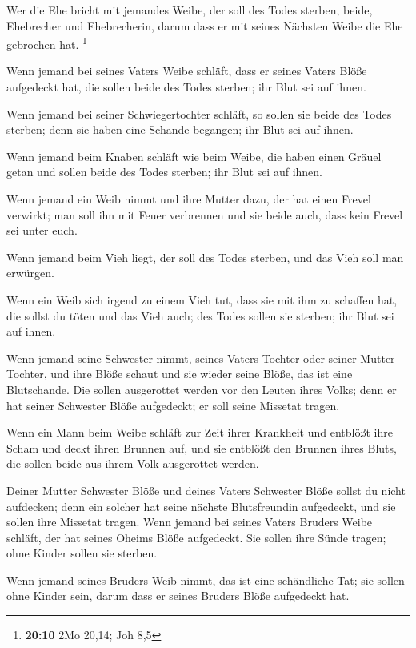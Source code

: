  Wer die Ehe bricht mit jemandes Weibe, der soll des
Todes sterben, beide, Ehebrecher und Ehebrecherin, darum dass er mit
seines Nächsten Weibe die Ehe gebrochen hat. \footnote{\textbf{20:10}
  2Mo 20,14; Joh 8,5}

 Wenn jemand bei seines Vaters Weibe schläft, dass er
seines Vaters Blöße aufgedeckt hat, die sollen beide des Todes sterben;
ihr Blut sei auf ihnen.

 Wenn jemand bei seiner Schwiegertochter schläft, so
sollen sie beide des Todes sterben; denn sie haben eine Schande
begangen; ihr Blut sei auf ihnen.

 Wenn jemand beim Knaben schläft wie beim Weibe, die
haben einen Gräuel getan und sollen beide des Todes sterben; ihr Blut
sei auf ihnen.

 Wenn jemand ein Weib nimmt und ihre Mutter dazu, der hat
einen Frevel verwirkt; man soll ihn mit Feuer verbrennen und sie beide
auch, dass kein Frevel sei unter euch.

 Wenn jemand beim Vieh liegt, der soll des Todes sterben,
und das Vieh soll man erwürgen.

 Wenn ein Weib sich irgend zu einem Vieh tut, dass sie
mit ihm zu schaffen hat, die sollst du töten und das Vieh auch; des
Todes sollen sie sterben; ihr Blut sei auf ihnen.

 Wenn jemand seine Schwester nimmt, seines Vaters Tochter
oder seiner Mutter Tochter, und ihre Blöße schaut und sie wieder seine
Blöße, das ist eine Blutschande. Die sollen ausgerottet werden vor den
Leuten ihres Volks; denn er hat seiner Schwester Blöße aufgedeckt; er
soll seine Missetat tragen.

 Wenn ein Mann beim Weibe schläft zur Zeit ihrer
Krankheit und entblößt ihre Scham und deckt ihren Brunnen auf, und sie
entblößt den Brunnen ihres Bluts, die sollen beide aus ihrem Volk
ausgerottet werden.

 Deiner Mutter Schwester Blöße und deines Vaters
Schwester Blöße sollst du nicht aufdecken; denn ein solcher hat seine
nächste Blutsfreundin aufgedeckt, und sie sollen ihre Missetat tragen.
 Wenn jemand bei seines Vaters Bruders Weibe schläft, der
hat seines Oheims Blöße aufgedeckt. Sie sollen ihre Sünde tragen; ohne
Kinder sollen sie sterben.

 Wenn jemand seines Bruders Weib nimmt, das ist eine
schändliche Tat; sie sollen ohne Kinder sein, darum dass er seines
Bruders Blöße aufgedeckt hat.

